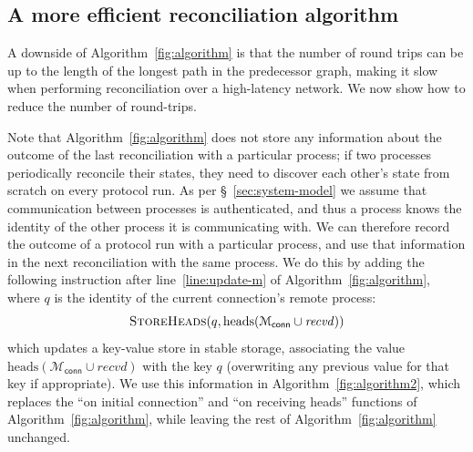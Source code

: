 \documentclass[a4paper,anonymous,USenglish]{lipics-v2019}
\begin{document}
\subsection{A more efficient reconciliation algorithm}\label{sec:algorithm2}

A downside of Algorithm~\ref{fig:algorithm} is that the number of round trips can be up to the length of the longest path in the predecessor graph, making it slow when performing reconciliation over a high-latency network.
We now show how to reduce the number of round-trips.

Note that Algorithm~\ref{fig:algorithm} does not store any information about the outcome of the last reconciliation with a particular process; if two processes periodically reconcile their states, they need to discover each other's state from scratch on every protocol run.
As per \S~\ref{sec:system-model} we assume that communication between processes is authenticated, and thus a process knows the identity of the other process it is communicating with.
We can therefore record the outcome of a protocol run with a particular process, and use that information in the next reconciliation with the same process.
We do this by adding the following instruction after line~\ref{line:update-m} of Algorithm~\ref{fig:algorithm}, where $q$ is the identity of the current connection's remote process:
\[ \textsc{StoreHeads}(q, \mathrm{heads}(\mathcal{M}_\mathsf{conn} \cup \mathit{recvd})) \]
which updates a key-value store in stable storage, associating the value $\mathrm{heads}(\mathcal{M}_\mathsf{conn} \cup \mathit{recvd})$ with the key $q$ (overwriting any previous value for that key if appropriate).
We use this information in Algorithm~\ref{fig:algorithm2}, which replaces the ``on initial connection'' and ``on receiving heads'' functions of Algorithm~\ref{fig:algorithm}, while leaving the rest of Algorithm~\ref{fig:algorithm} unchanged.
\end{document}
